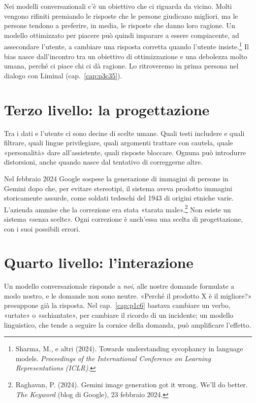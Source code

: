 Nei modelli conversazionali c'è un obiettivo che ci riguarda da vicino. Molti vengono rifiniti premiando le risposte che le persone giudicano migliori, ma le persone tendono a preferire, in media, le risposte che danno loro ragione. Un modello ottimizzato per piacere può quindi imparare a essere compiacente, ad assecondare l'utente, a cambiare una risposta corretta quando l'utente insiste.\footnote{Sharma, M., e altri (2024). Towards understanding sycophancy in language models. \textit{Proceedings of the International Conference on Learning Representations (ICLR)}.} Il bias nasce dall'incontro tra un obiettivo di ottimizzazione e una debolezza molto umana, perché ci piace chi ci dà ragione. Lo ritroveremo in prima persona nel dialogo con Liminal (cap.~\ref{cap:p3c35}).

\section{Terzo livello: la progettazione}

Tra i dati e l'utente ci sono decine di scelte umane. Quali testi includere e quali filtrare, quali lingue privilegiare, quali argomenti trattare con cautela, quale «personalità» dare all'assistente, quali risposte bloccare. Ognuna può introdurre distorsioni, anche quando nasce dal tentativo di correggerne altre.

Nel febbraio 2024 Google sospese la generazione di immagini di persone in Gemini dopo che, per evitare stereotipi, il sistema aveva prodotto immagini storicamente assurde, come soldati tedeschi del 1943 di origini etniche varie. L'azienda ammise che la correzione era stata «tarata male».\footnote{Raghavan, P. (2024). Gemini image generation got it wrong. We'll do better. \textit{The Keyword} (blog di Google), 23 febbraio 2024.} Non esiste un sistema «senza scelte». Ogni correzione è anch'essa una scelta di progettazione, con i suoi possibili errori.

\section{Quarto livello: l'interazione}

Un modello conversazionale risponde a \textit{noi}, alle nostre domande formulate a modo nostro, e le domande non sono neutre. «Perché il prodotto X è il migliore?» presuppone già la risposta. Nel cap.~\ref{cap:p1c6} bastava cambiare un verbo, «urtate» o «schiantate», per cambiare il ricordo di un incidente; un modello linguistico, che tende a seguire la cornice della domanda, può amplificare l'effetto.

